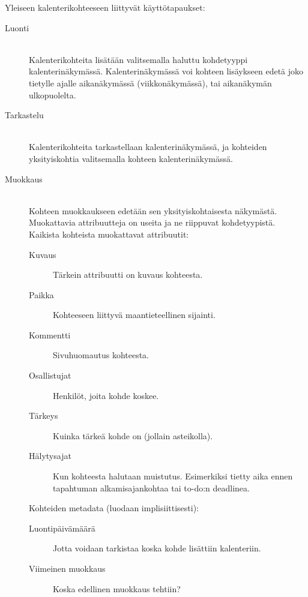 \documentclass[a4paper,12pt]{report}
\begin{document}
Yleiseen kalenterikohteeseen liittyvät käyttötapaukset:
\begin{description}
   \item[Luonti]\hfill\\
      Kalenterikohteita lisätään valitsemalla haluttu kohdetyyppi
      kalenteri\-näky\-mäs\-sä. Kalenterinäkymässä voi kohteen lisäykseen edetä joko
      tietylle ajalle aikanäkymässä (viikkonäkymässä), tai aikanäkymän
      ulkopuolelta.

   \item[Tarkastelu]\hfill\\
      Kalenterikohteita tarkastellaan kalenterinäkymässä, ja kohteiden
      yksityiskohtia valitsemalla kohteen kalenterinäkymässä.

   \item[Muokkaus]\hfill\\
      Kohteen muokkaukseen edetään sen yksityiskohtaisesta näkymästä.
      Muokattavia attribuutteja on useita ja ne riippuvat kohdetyypistä.
      Kaikista kohteista muokattavat attribuutit:
      \begin{description}
         \item[Kuvaus]  Tärkein attribuutti on kuvaus kohteesta.
         \item[Paikka]  Kohteeseen liittyvä maantieteellinen sijainti.
         \item[Kommentti]  Sivuhuomautus kohteesta.
         \item[Osallistujat] Henkilöt, joita kohde koskee.
         \item[Tärkeys]  Kuinka tärkeä kohde on (jollain asteikolla).
         \item[Hälytysajat]  Kun kohteesta halutaan muistutus. Esimerkiksi
            tietty aika ennen tapahtuman alkamisajankohtaa tai to-do:n
            deadlinea.
      \end{description}

      Kohteiden metadata (luodaan implisiittisesti):
      \begin{description}
         \item[Luontipäivämäärä]  Jotta voidaan tarkistaa koska kohde lisättiin
            kalenteriin.
         \item[Viimeinen muokkaus]  Koska edellinen muokkaus tehtiin?
      \end{description}


\end{description}
\end{document}
